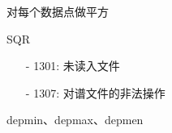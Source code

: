 \label{cmd:sqr}

对每个数据点做平方

\begin{SACSTX}
SQR
\end{SACSTX}

\begin{itemize}
\item[-]1301: 未读入文件
\item[-]1307: 对谱文件的非法操作
\end{itemize}

depmin、depmax、depmen

